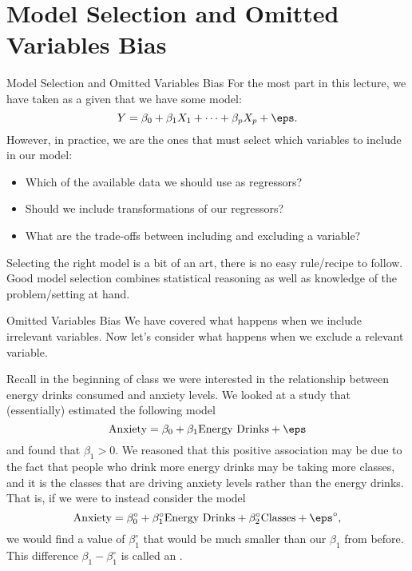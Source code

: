\documentclass[notheorems, 9pt]{beamer}
\begin{document}
\section{Model Selection and Omitted Variables Bias}%
\begin{frame}{Model Selection and Omitted Variables Bias} %
	\label{frame:mht24} %
	For the most part in this lecture, we have taken as a given that we have some model:
	\[
	    Y= \beta_0 + \beta_1X_1 + \dots+\beta_pX_p + \eps
	.\] 
	\onslide<2->
	However, in practice, we are the ones that must select which variables to include in our model:
	\begin{itemize}
		\item Which of the available data we should use as regressors?
		\item Should we include transformations of our regressors?
		\item What are the trade-offs between including and excluding a variable?
	\end{itemize}
	Selecting the right model is a bit of an art, there is no easy rule/recipe to follow. Good model selection combines statistical reasoning as well as knowledge of the problem/setting at hand.
\end{frame}

\begin{frame}{Omitted Variables Bias} %
	\label{frame:omitted1} %
	We have covered what happens when we include irrelevant variables. Now let's consider what happens when we exclude a relevant variable.

	Recall in the beginning of class we were interested in the relationship between energy drinks consumed and anxiety levels. We looked at a study that (essentially) estimated the following model
	\[
		\text{Anxiety} = \beta_0 + \beta_1\text{Energy Drinks} + \eps
	\]
	and found that \(\beta_1 > 0\). We reasoned that this positive association may be due to the fact that people who drink more energy drinks may be taking more classes, and it is the classes that are driving anxiety levels rather than the energy drinks. That is, if we were to instead consider the model
	\[
		\text{Anxiety} = \beta_0^\circ + \beta_1^\circ\text{Energy Drinks} + \beta_2^\circ\text{Classes} + \eps^\circ
	,\]
	we would find a value of \(\beta_1^\circ\) that would be much smaller than our \(\beta_1\) from before. This difference  \(\beta_1 - \beta_1^\circ\) is called an .
\end{frame}
\end{document}
